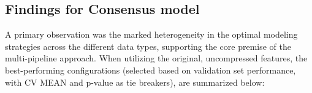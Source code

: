 \documentclass[12pt,a4paper]{report}
\begin{document}
\subsection{Findings for Consensus model}
\label{sec:findings_for_consensus_model}
\noindent
A primary observation was the marked heterogeneity in the optimal modeling strategies across the different data types, supporting the core premise of the multi-pipeline approach. When utilizing the original, uncompressed features, the best-performing configurations (selected based on validation set performance, with CV MEAN and p-value as tie breakers), are summarized below:
\begin{table}[H]
    \centering
    \hspace*{-1cm}
    \caption[Optimal Modeling Configurations Uncompressed Features]{Optimal Modeling Configurations for Uncompressed Features}
    \label{tab:optimal_configs_uncompressed}
\end{table}
\end{document}
